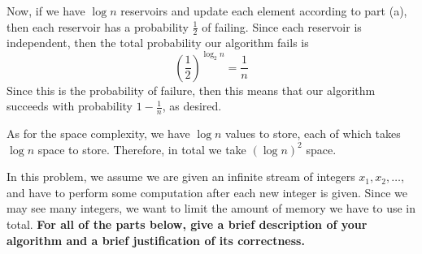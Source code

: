 \documentclass[11pt]{article}
\begin{document}
\begin{subparts}
\begin{solution}
		Now, if we have \( \log n \) reservoirs and update each element according to part (a), then each reservoir has a probability
		\( \frac{1}{2} \) of failing. Since each reservoir is independent, then the total probability our algorithm 
		fails is
		\[
			\left( \frac{1}{2} \right) ^{\log_2 n} = \frac{1}{n}
		\] 
		Since this is the probability of failure, then this means that our algorithm succeeds with probability 
		\( 1 - \frac{1}{n} \), as desired. 

		As for the space complexity, we have \( \log n \) values to store, each of which takes \( \log n \) space to store. 
		Therefore, in total we take \( (\log n)^2 \) space. 
	\end{solution}
\end{subparts}

\newpage

In this problem, we assume we are given an infinite stream of integers $x_1, x_2, \dots$, and have to perform some computation after each new integer is given.
Since we may see many integers, we want to limit the amount of memory we have to use in total.
\textbf{For all of the parts below, give a brief description of your algorithm and a brief justification of its correctness.}
\end{document}
